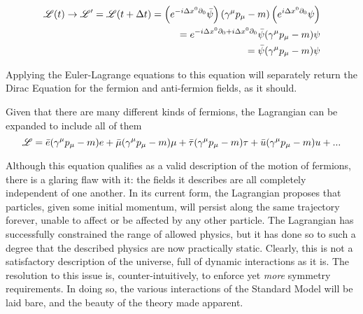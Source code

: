     \begin{equation} \begin{split}
        \mathscr{L}(t) \to \mathscr{L}' = \mathscr{L}(t+\Delta t) =
            \left( e^{-i\Delta x^0 \partial_0} \bar{\psi} \right) (\gamma^\mu p_\mu - m) \left( e^{i\Delta x^0 \partial_0}\psi \right)
        \\  = e^{-i\Delta x^0 \partial_0 + i \Delta x^0 \partial_0} \bar{\psi} (\gamma^\mu p_\mu - m) \psi
        \\  = \bar{\psi} (\gamma^\mu p_\mu - m) \psi
    \end{split} \end{equation}

    Applying the Euler-Lagrange equations to this equation will separately return the Dirac Equation
        for the fermion and anti-fermion fields, as it should.

    Given that there are many different kinds of fermions, the Lagrangian can be expanded to include all of them
    \begin{equation}
        \mathscr{L} = \bar{e} (\gamma^\mu p_\mu - m) e
        + \bar{\mu} (\gamma^\mu p_\mu - m) \mu
        + \bar{\tau} (\gamma^\mu p_\mu - m) \tau
        + \bar{u} (\gamma^\mu p_\mu - m) u
        + ...
    \end{equation}

    Although this equation qualifies as a valid description of the motion of fermions,
        there is a glaring flaw with it: the fields it describes are all completely independent of one another.
    In its current form, the Lagrangian proposes that particles, given some initial momentum,
        will persist along the same trajectory forever, unable to affect or be affected by any other particle.
    The Lagrangian has successfully constrained the range of allowed physics,
        but it has done so to such a degree that the described physics are now practically static.
    Clearly, this is not a satisfactory description of the universe, full of dynamic interactions as it is.
    The resolution to this issue is, counter-intuitively, to enforce yet \textit{more} symmetry requirements.
    In doing so, the various interactions of the Standard Model will be laid bare,
        and the beauty of the theory made apparent.




